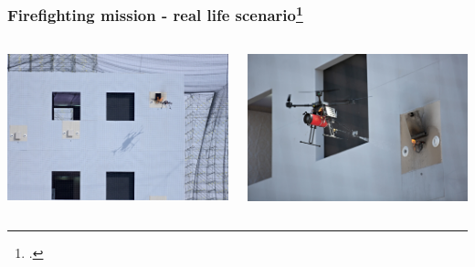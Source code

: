 \begin{frame}
	\frametitle{Firefighting mission - real life scenario\footcite{mbzirc}}
	\begin{columns}
		\begin{column}{0.5\textwidth}\centering
			\begin{center}
				\includegraphics[width=1\textwidth]{figures/mbzirc_1}
				\label{fig:forest_uav}
			\end{center}
		\end{column}
		\begin{column}{0.5\textwidth}\centering
			\begin{center}
				\includegraphics[width=1\textwidth]{figures/mbzirc_2}
				\label{fig:forest_uav}
			\end{center}
		\end{column}
	\end{columns}
	
\end{frame}